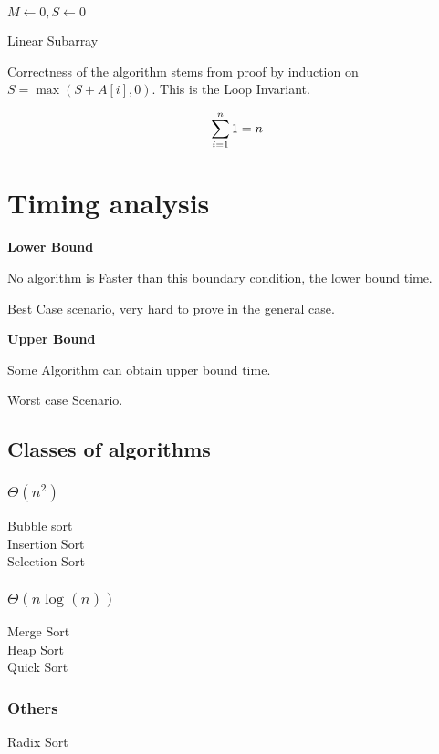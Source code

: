\documentclass[english, 10pt]{article}
\begin{document}
\begin{algorithm}[H]
$M \gets 0,S \gets 0$\;
\caption{Linear Subarray }
\end{algorithm}

Correctness of the algorithm stems from proof by induction on $S = \max(S+A[i], 0)$. This is the Loop Invariant.

$$
\sum_{i=1}^n 1 = n \\
$$

\section{Timing analysis}
\textbf{Lower Bound}

No algorithm is Faster than this boundary condition, the lower bound time.

Best Case scenario, very hard to prove in the general case.

\textbf{Upper Bound}

Some Algorithm can obtain upper bound time.

Worst case Scenario.

\subsection{Classes of algorithms}
\subsubsection{$\Theta(n^2)$}
    Bubble sort \\
    Insertion Sort \\
    Selection Sort \\
\subsubsection{$\Theta(n\log(n))$}
    Merge Sort \\
    Heap Sort \\
    Quick Sort \\
\subsubsection{Others}
    Radix Sort

\end{document}
